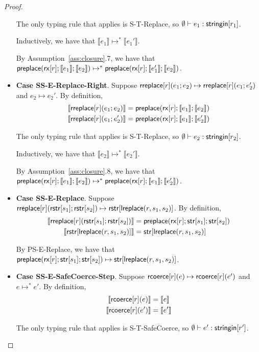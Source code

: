 \documentclass[11pt,leqno]{article}
\theoremstyle{definition}
\newcommand{\rcoerce}[2]{{\sf rcoerce}[#1](#2)}
\newcommand{\stringin}[1]{{\sf stringin}[#1]}
\renewcommand{\tstr}[1]{{{\sf str}[#1]}}
\newcommand{\preplace}[3]{{\sf preplace}(#1;#2;#3)}
\newcommand{\treplace}[3]{{\sf preplace}(#1;#2;#3)}
\newcommand{\rx}[1]{ {\sf rx}[#1] }
\newcommand{\lreplace}[3]{{\sf lreplace}(#1; #2; #3)}
\newcommand{\trden}[1]{\llbracket #1 \rrbracket} %
\renewcommand{\lreplace}[3]{{\sf lreplace}(#1, #2, #3)}
\begin{document}
\begin{proof}
\begin{itemize}[label=$ $,itemsep=1ex]
The only typing rule that applies is S-T-Replace, so $\emptyset \vdash e_1 : \stringin{r_1}$.

Inductively, we have that $\trden{e_1} \mapsto^* \trden{e_1'}$.

By Assumption~\ref{ass:closure}.7, we have that $\treplace{\rx{r}}{\trden{e_1}}{\trden{e_2}} \mapsto^* \treplace{\rx{r}}{\trden{e_1'}}{\trden{e_2}}$.


\item \textbf{Case SS-E-Replace-Right}. 
Suppose ${\sf rreplace}[r](e_1;e_2) \mapsto {\sf rreplace}[r](e_1;e_2')$
and $e_2 \mapsto e_2'$.
By definition,
\begin{align*}
\trden{\rreplace{r}{e_1}{e_2}} &= \treplace{\rx{r}}{\trden{e_1}}{\trden{e_2}} \\
\trden{\rreplace{r}{e_1}{e_2'}} &= \treplace{\rx{r}}{\trden{e_1}}{\trden{e_2'}}
\end{align*}

The only typing rule that applies is S-T-Replace, so $\emptyset \vdash e_2 : \stringin{r_2}$.

Inductively, we have that $\trden{e_2} \mapsto^* \trden{e_2'}$.

By Assumption~\ref{ass:closure}.8, we have that 
$\treplace{\rx{r}}{\trden{e_1}}{\trden{e_2}} \mapsto^* \treplace{\rx{r}}{\trden{e_1}}{\trden{e_2'}}$.

\item \textbf{Case SS-E-Replace}. 
Suppose $\rreplace{r}{\rstr{s_1}}{\rstr{s_2}} \mapsto \rstr{\lreplace{r}{s_1}{s_2}}$.
By definition,
\begin{align*}
\trden{\rreplace{r}{\rstr{s_1}}{\rstr{s_2}}} &= \preplace{\rx{r}}{\tstr{s_1}}{\tstr{s_2}} \\
\trden{\rstr{\lreplace{r}{s_1}{s_2}}} &= \tstr{\lreplace{r}{s_1}{s_2}}
\end{align*}

By PS-E-Replace, we have that 
$\preplace{\rx{r}}{\tstr{s_1}}{\tstr{s_2}} \mapsto \tstr{\lreplace{r}{s_1}{s_2}}$.

\item \textbf{Case SS-E-SafeCoerce-Step}. 
Suppose $\rcoerce{r}{e} \mapsto \rcoerce{r}{e'}$ and $e \mapsto^* e'$.
By definition,
\begin{align*}
\trden{\rcoerce{r}{e}} &= \trden{e} \\
\trden{\rcoerce{r}{e'}} &= \trden{e'}
\end{align*}

The only typing rule that applies is S-T-SafeCoerce, so $\emptyset \vdash e' : \stringin{r'}$.


\end{itemize}
\end{proof}
\end{document}
